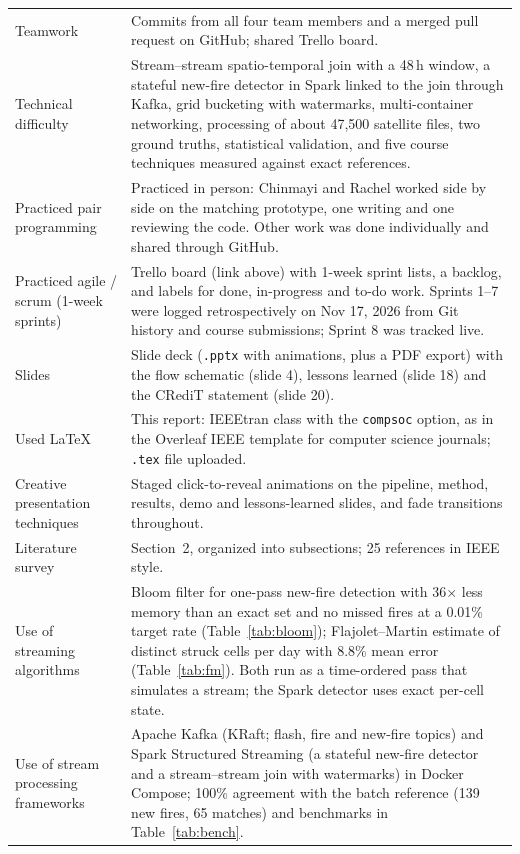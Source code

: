 \documentclass[10pt,journal,compsoc]{IEEEtran}
\begin{document}
\begin{tabularx}{\textwidth}{@{}>{\raggedright\arraybackslash}p{3.6cm}>{\raggedright\arraybackslash}X@{}}
Teamwork & Commits from all four team members and a merged pull request on GitHub; shared Trello board. \\
Technical difficulty & Stream--stream spatio-temporal join with a 48\,h window, a stateful new-fire detector in Spark linked to the join through Kafka, grid bucketing with watermarks, multi-container networking, processing of about 47,500 satellite files, two ground truths, statistical validation, and five course techniques measured against exact references. \\
Practiced pair programming & Practiced in person: Chinmayi and Rachel worked side by side on the matching prototype, one writing and one reviewing the code. Other work was done individually and shared through GitHub. \\
Practiced agile / scrum (1-week sprints) & Trello board (link above) with 1-week sprint lists, a backlog, and labels for done, in-progress and to-do work. Sprints 1--7 were logged retrospectively on Nov 17, 2026 from Git history and course submissions; Sprint 8 was tracked live. \\
Slides & Slide deck (\texttt{.pptx} with animations, plus a PDF export) with the flow schematic (slide 4), lessons learned (slide 18) and the CRediT statement (slide 20). \\
Used \LaTeX & This report: IEEEtran class with the \texttt{compsoc} option, as in the Overleaf IEEE template for computer science journals; \texttt{.tex} file uploaded. \\
Creative presentation techniques & Staged click-to-reveal animations on the pipeline, method, results, demo and lessons-learned slides, and fade transitions throughout. \\
Literature survey & Section~2, organized into subsections; 25 references in IEEE style. \\
Use of streaming algorithms & Bloom filter for one-pass new-fire detection with 36$\times$ less memory than an exact set and no missed fires at a 0.01\% target rate (Table~\ref{tab:bloom}); Flajolet--Martin estimate of distinct struck cells per day with 8.8\% mean error (Table~\ref{tab:fm}). Both run as a time-ordered pass that simulates a stream; the Spark detector uses exact per-cell state. \\
Use of stream processing frameworks & Apache Kafka (KRaft; flash, fire and new-fire topics) and Spark Structured Streaming (a stateful new-fire detector and a stream--stream join with watermarks) in Docker Compose; 100\% agreement with the batch reference (139 new fires, 65 matches) and benchmarks in Table~\ref{tab:bench}. \\

\end{tabularx}
\end{document}
